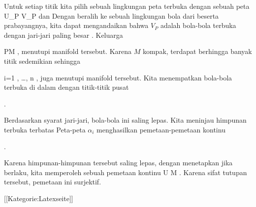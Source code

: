 Untuk setiap titik
 kita pilih sebuah lingkungan peta terbuka
 dengan sebuah peta
 {U_P } {V_P
} {}
dan
 Dengan beralih ke sebuah lingkungan bola dari
 beserta prabayangnya, kita dapat mengandaikan bahwa $V_P$ adalah bola-bola terbuka dengan jari-jari paling besar
. Keluarga

 {}
 {P\in M} {}
 {} {} {} {,}
menutupi manifold tersebut. Karena $M$ kompak, terdapat berhingga banyak titik
 sedemikian sehingga

 {}
 {i=1 , \ldots , n} {}
 {} {} {} {,}
juga menutupi manifold tersebut. Kita menempatkan bola-bola terbuka
 di dalam
 {} {}
dengan titik-titik pusat

 { . }

Berdasarkan syarat jari-jari, bola-bola ini saling lepas. Kita meninjau himpunan terbuka terbatas
 Peta-peta $\alpha_i$ menghasilkan pemetaan-pemetaan kontinu

 { . }

Karena himpunan-himpunan tersebut saling lepas, dengan menetapkan
 jika
 berlaku, kita memperoleh sebuah pemetaan kontinu
\maabbdisp {\varphi} { U } {M
} {.}
Karena sifat tutupan tersebut, pemetaan ini surjektif.

 [[Kategorie:Latexseite]]
